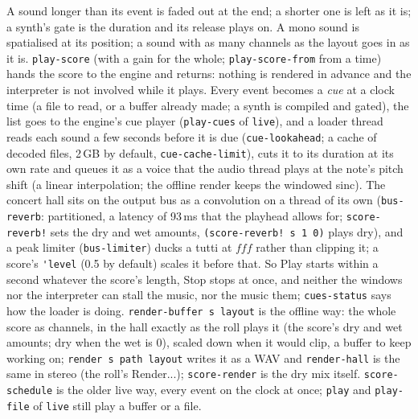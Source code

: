 \documentclass[11pt,a4paper]{article}
\newcommand{\musil}[1]{\lstinline[style=musilinline]{#1}}
\begin{document}
A sound longer than its event is faded out at the end; a shorter one is left as it is; a
synth's gate is the duration and its release plays on. A mono sound is spatialised at its
position; a sound with as many channels as the layout goes in as it is. \musil{play-score}
(with a gain for the whole; \musil{play-score-from} from a time) hands the score to the
engine and returns: nothing is rendered in advance and the interpreter is not involved
while it plays. Every event becomes a \emph{cue} at a clock time (a file to read, or a
buffer already made; a synth is compiled and gated), the list goes to the engine's cue
player (\musil{play-cues} of \texttt{live}), and a loader thread reads each sound a few
seconds before it is due (\musil{cue-lookahead}; a cache of decoded files, 2\,GB by
default, \musil{cue-cache-limit}), cuts it to its duration at its own rate and queues it as
a voice that the audio thread plays at the note's pitch shift (a linear interpolation; the
offline render keeps the windowed sinc). The concert hall sits on the output bus as a
convolution on a thread of its own (\musil{bus-reverb}: partitioned, a latency of 93\,ms
that the playhead allows for; \musil{score-reverb!} sets the dry and wet amounts,
\musil{(score-reverb! s 1 0)} plays dry), and a peak limiter (\musil{bus-limiter}) ducks a
tutti at $fff$ rather than clipping it; a score's \musil{'level} (0.5 by default) scales it
before that. So Play starts within a second whatever the score's length, Stop stops at
once, and neither the windows nor the interpreter can stall the music, nor the music them;
\musil{cues-status} says how the loader is doing. \musil{render-buffer s layout} is the
offline way: the whole score as channels, in the hall exactly as the roll plays it (the
score's dry and wet amounts; dry when the wet is 0), scaled down when it would clip, a
buffer to keep working on; \musil{render s path layout} writes it as a WAV and
\musil{render-hall} is the same in stereo (the roll's Render...); \musil{score-render} is
the dry mix itself. \musil{score-schedule} is the older live way, every event on the clock
at once; \musil{play} and \musil{play-file} of \texttt{live} still play a buffer or a
file.
\end{document}

